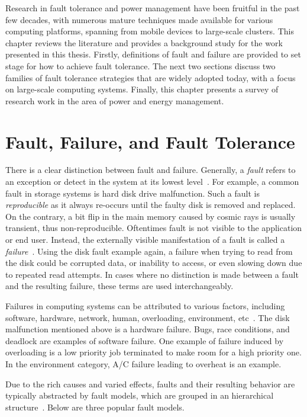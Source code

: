Research in fault tolerance and power management have been fruitful in the past few decades, with numerous mature techniques made available for various computing platforms, spanning from mobile devices to large-scale clusters. This chapter reviews the literature and provides a background study for the work presented in this thesis. Firstly, definitions of fault and failure are provided to set stage for how to achieve fault tolerance. The next two sections discuss two families of fault tolerance strategies that are widely adopted today, with a focus on large-scale computing systems. Finally, this chapter presents a survey of research work in the area of power and energy management.

\section{Fault, Failure, and Fault Tolerance}

There is a clear distinction between fault and failure. Generally, a \textit{fault} refers to an exception or detect in the system at its lowest level~\cite{Jalote:1994:FTD:179250,gartner1999fundamentals}. For example, a common fault in storage systems is hard disk drive malfunction. Such a fault is \textit{reproducible} as it always re-occurs until the faulty disk is removed and replaced. On the contrary, a bit flip in the main memory caused by cosmic rays is usually transient, thus non-reproducible. Oftentimes fault is not visible to the application or end user. Instead, the externally visible manifestation of a fault is called a \textit{failure}~\cite{gartner1999fundamentals}. Using the disk fault example again, a failure when trying to read from the disk could be corrupted data, or inability to access, or even slowing down due to repeated read attempts. In cases where no distinction is made between a fault and the resulting failure, these terms are used interchangeably. 

Failures in computing systems can be attributed to various factors, including software, hardware, network, human, overloading, environment, etc~\cite{schroeder_dsn_2006}. The disk malfunction mentioned above is a hardware failure. Bugs, race conditions, and deadlock are examples of software failure. One example of failure induced by overloading is a low priority job terminated to make room for a high priority one. In the environment category, A/C failure leading to overheat is an example.     

Due to the rich causes and varied effects, faults and their resulting behavior are typically abstracted by fault models, which are grouped in an hierarchical structure~\cite{gartner1999fundamentals,cristian1991understanding,schneider1993good}. Below are three popular fault models.

